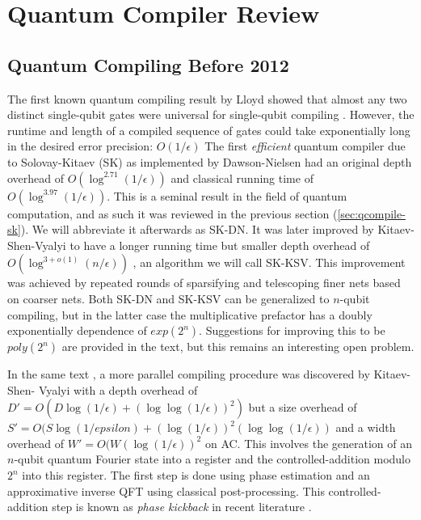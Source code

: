 \section{Quantum Compiler Review}
\label{sec:qcompile-review}

\subsection{Quantum Compiling Before 2012}
\label{subsec:qcompiile-pre2012}

The first known quantum compiling result by Lloyd showed that almost any two
distinct single-qubit gates were universal for single-qubit compiling
\cite{Lloyd1995}. However, the runtime and length of a compiled sequence of gates
could take exponentially long in the desired error precision: $O(1/\epsilon)$
The first \emph{efficient} quantum compiler due to
Solovay-Kitaev (SK) as implemented by Dawson-Nielsen had an original depth overhead
of $O(\log^{2.71}(1/\epsilon))$ and classical
running time of $O(\log^{3.97}(1/\epsilon))$. This is a seminal result in
the field of quantum computation, and as such it was reviewed in the previous
section (\ref{sec:qcompile-sk}). We will abbreviate it afterwards as SK-DN.
It was later improved by Kitaev-Shen-Vyalyi
to have a longer running time but smaller depth overhead of $O(\log^{3+o(1)}(n/\epsilon))$
\cite{Kitaev2002}, an algorithm we will call SK-KSV.
This improvement was achieved by repeated rounds of sparsifying and
telescoping finer nets based on coarser nets. Both SK-DN and SK-KSV can be
generalized to $n$-qubit compiling, but in the latter case the multiplicative
prefactor has a doubly exponentially dependence of $exp(2^n)$. Suggestions
for improving this to be $poly(2^n)$ are provided in the text, but this remains
an interesting open problem.

In the same text \cite{Kitaev2002},
a more parallel compiling procedure was discovered by Kitaev-Shen-
Vyalyi with a depth overhead of $D' = O(D\log(1/\epsilon) + (\log\log(1/\epsilon))^2)$ but
a size overhead of $S' = O(S\log(1/epsilon) + (\log(1/\epsilon))^2 (\log\log(1/\epsilon))$
and a width overhead of $W' = O(W(\log(1/\epsilon))^2$
on \textsf{AC}.
This involves the generation of an $n$-qubit quantum Fourier state into a register
and the controlled-addition
modulo $2^n$ into this register. The first step is done using phase estimation
and an approximative inverse QFT using classical post-processing.
This controlled-addition step is known as
\emph{phase kickback} in recent literature \cite{Jones2012}.


